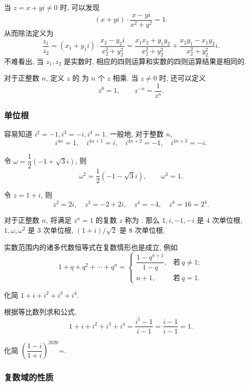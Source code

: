 当 $z=x+yi\neq0$ 时, 可以发现
  \[(x+yi)\cdot\frac{x-yi}{x^2+y^2}=1.\]
从而除法定义为
  \[\frac{z_1}{z_2}=(x_1+y_1i)\cdot\frac{x_2-y_2i}{x_2^2+y_2^2}=\frac{x_1x_2+y_1y_2}{x_2^2+y_2^2}+\frac{x_2y_1-x_1y_2}{x_2^2+y_2^2}i.\]
不难看出, 当 $z_1,z_2$ 是实数时, 相应的四则运算和实数的四则运算结果是相同的.

对于正整数 $n$, 定义 $z$ 的 为 $n$ 个 $z$ 相乘.
当 $z\neq 0$ 时, 还可以定义
\[z^0=1,\qquad z^{-n}=\frac1{z^n}.\]

\subsubsection{单位根}
\begin{example}\delspace
  \begin{enumnopar}[(i)]
    \item 容易知道 $i^2=-1,i^3=-i,i^4=1$.
    一般地, 对于整数 $n$, 
    \[i^{4n}=1,\quad i^{4n+1}=i,\quad i^{4n+2}=-1,\quad i^{4n+3}=-i.\]
    \item 令 $\omega=\dfrac12(-1+\sqrt 3i)$, 则
    \[\omega^2=\frac12(-1-\sqrt3i),\qquad\omega^3=1.\]
    \item 令 $z=1+i$, {则
    \[z^2=2i,\quad z^3=-2+2i,\quad z^4=-4,\quad z^8=16=2^4.\]}
  \end{enumnopar}

  对于正整数 $n$, 将满足 $z^n=1$ 的复数 $z$ 称为 .
  那么 $1,i,-1,-i$ 是 $4$ 次单位根, $1,\omega,\omega^2$ 是 $3$ 次单位根, $(1+i)/\sqrt2$ 是 $8$ 次单位根.
\end{example}

实数范围内的诸多代数恒等式在复数情形也是成立, 例如
\[1+q+q^2+\cdots+q^n=\begin{cases}
  \dfrac{1-q^{n+1}}{1-q},&\text{若}\ q\neq 1;\\
  n+1,&\text{若}\ q=1.
\end{cases}\]

\begin{example}
  化简 $1+i+i^2+i^3+i^4$.
\end{example}
\begin{solution}
  根据等比数列求和公式,
  \[1+i+i^2+i^3+i^4=\frac{i^5-1}{i-1}
  {=\frac{i-1}{i-1}=1.}\]
\end{solution}

\begin{exercise}
  化简 $\left(\dfrac{1-i}{1+i}\right)^{2020}$=\fillblank{}.
\end{exercise}

\subsubsection{复数域的性质\optional}
\label{sssec:complex-field}

